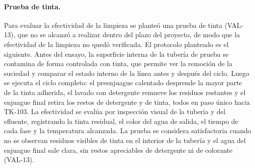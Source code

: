 \paragraph{Prueba de tinta.} Para evaluar la efectividad de la limpieza se planteó una prueba de tinta (VAL-13), que no se alcanzó a realizar dentro del plazo del proyecto, de modo que la efectividad de la limpieza no quedó verificada. El protocolo planteado es el siguiente. Antes del ensayo, la superficie interna de la tubería de prueba se contamina de forma controlada con tinta, que permite ver la remoción de la suciedad y comparar el estado interno de la línea antes y después del ciclo. Luego se ejecuta el ciclo completo: el preenjuague calentado desprende la mayor parte de la tinta adherida, el lavado con detergente remueve los residuos restantes y el enjuague final retira los restos de detergente y de tinta, todos en paso único hacia TK-103. La efectividad se evalúa por inspección visual de la tubería y del efluente, registrando la tinta residual, el color del agua de salida, el tiempo de cada fase y la temperatura alcanzada. La prueba se considera satisfactoria cuando no se observan residuos visibles de tinta en el interior de la tubería y el agua del enjuague final sale clara, sin restos apreciables de detergente ni de colorante (VAL-13).
